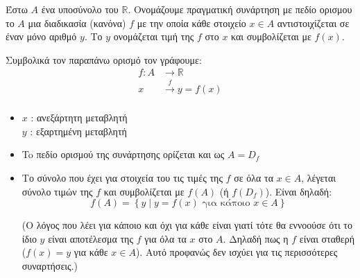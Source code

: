 \begin{tcolorbox}[colback=blue!10!white, colframe=blue!50!black, title=Ορισμός Συνάρτησης]
Έστω $A$ ένα υποσύνολο του $\mathbb{R}$. Ονομάζουμε πραγματική συνάρτηση με πεδίο ορισμου το $A$ μια διαδικασία (κανόνα) $f$ με την οποία κάθε στοιχείο $x\in A$ αντιστοιχίζεται σε έναν μόνο αριθμό $y$. Το $y$ ονομάζεται τιμή της $f$ στο $x$ και συμβολίζεται με $f(x)$.
\end{tcolorbox}

Συμβολικά τον παραπάνω ορισμό τον γράφουμε:
\begin{align*}
f \colon A &\to \mathbb{R}\\
x &\xrightarrow{f} y = f(x)\\
\end{align*}

\begin{itemize}
    \item $x$ : ανεξάρτητη μεταβλητή\\
    $y$ : εξαρτημένη μεταβλητή

    \item To πεδίο ορισμού της συνάρτησης ορίζεται και ως $A = D_{f}$


    \item Το σύνολο που έχει για στοιχεία του τις τιμές της $f$ σε όλα τα $x\in A$, λέγεται σύνολο τιμών της $f$ και συμβολίζεται με $f(A)$ (ή $f(D_{f})$). Είναι δηλαδή:
    \[
        f(A) = \left\{ y \mid y = f(x) \text{ για κάποιο } x \in A \right\}
    \]

    (Ο λόγος που λέει για κάποιο και όχι για κάθε είναι γιατί τότε θα εννοούσε ότι το ίδιο $y$ είναι αποτέλεσμα της $f$ για όλα τα $x$ στο $A$. Δηλαδή πως η $f$ είναι σταθερή ($f(x) = y$ για κάθε $x \in A$). Αυτό προφανώς δεν ισχύει για τις περισσότερες συναρτήσεις.)
\end{itemize}

